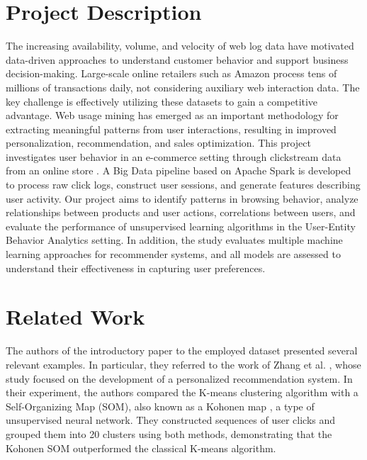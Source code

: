 \documentclass[a4paper,oneside,12pt]{book}
\title{\reporttitle}
\author{\authorname}
\begin{document}

\begin{center}
\end{center}

\vspace{0.5em}

\section{Project Description}
The increasing availability, volume, and velocity of web log data have motivated data-driven approaches to understand customer behavior and support business decision-making. Large-scale online retailers such as Amazon process tens of millions of transactions daily, not considering auxiliary web interaction data. The key challenge is effectively utilizing these datasets to gain a competitive advantage. Web usage mining has emerged as an important methodology for extracting meaningful patterns from user interactions, resulting in improved personalization, recommendation, and sales optimization.
This project investigates user behavior in an e-commerce setting through clickstream data from an online store \cite{clickstream_data_for_online_shopping_553}. A Big Data pipeline based on Apache Spark is developed to process raw click logs, construct user sessions, and generate features describing user activity.  Our project aims to identify patterns in browsing behavior, analyze relationships between products and user actions, correlations between users, and evaluate the performance of unsupervised learning algorithms in the User-Entity Behavior Analytics setting. In addition, the study evaluates multiple machine learning approaches for recommender systems, and all models are assessed to understand their effectiveness in capturing user preferences.

\section{Related Work}

The authors of the introductory paper to the employed dataset \cite{lapczynski2013discovering} presented several relevant examples. In particular, they referred to the work of Zhang et al. \cite{zhang2007personalised}, whose study focused on the development of a personalized recommendation system. In their experiment, the authors compared the K-means clustering algorithm with a Self-Organizing Map (SOM), also known as a Kohonen map \cite{kohonen1981similarity, kohonen198259}, a type of unsupervised neural network. They constructed sequences of user clicks and grouped them into 20 clusters using both methods, demonstrating that the Kohonen SOM outperformed the classical K-means algorithm.
\end{document}
